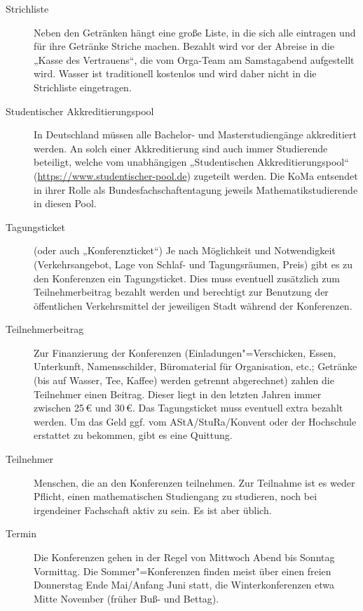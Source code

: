 \begin{description}
\item[Strichliste] Neben den Getränken hängt eine große Liste, in die sich alle
	eintragen und für ihre Getränke Striche machen.  Bezahlt wird vor der
	Abreise in die „Kasse des Vertrauens“, die vom Orga-Team am Samstagabend
	aufgestellt wird.  Wasser ist traditionell kostenlos und wird daher nicht
	in die Strichliste eingetragen.

\item[Studentischer Akkreditierungspool]\label{itm:pool} In Deutschland müssen alle Bachelor-
	und Masterstudiengänge akkreditiert werden. An solch einer Akkreditierung
	sind auch immer Studierende beteiligt, welche vom unabhängigen
	„Studentischen Akkreditierungspool“
	(\url{https://www.studentischer-pool.de}) zugeteilt werden. Die KoMa
	entsendet in ihrer Rolle als Bundesfachschaftentagung jeweils
	Mathematikstudierende in diesen Pool.

\item[Tagungsticket] (oder auch „Konferenzticket“) Je nach Möglichkeit und
	Notwendigkeit (Verkehrsangebot, Lage von Schlaf- und Tagungsräumen, Preis)
	gibt es zu den Konferenzen ein Tagungsticket. Dies muss eventuell
	zusätzlich zum Teilnehmerbeitrag bezahlt werden und berechtigt zur
	Benutzung der öffentlichen Verkehrsmittel der jeweiligen Stadt während der
	Konferenzen.

\item[Teilnehmerbeitrag] Zur Finanzierung der Konferenzen
	(Einladungen"=Verschicken, Essen, Unterkunft, Namensschilder, Büromaterial
	für Organisation, etc.; Getränke (bis auf Wasser, Tee, Kaffee) werden
	getrennt abgerechnet) zahlen die Teilnehmer einen Beitrag. Dieser liegt in
	den letzten Jahren immer zwischen 25\,€ und 30\,€. Das Tagungsticket muss
	eventuell extra bezahlt werden. Um das Geld ggf. vom AStA/StuRa/Konvent
	oder der Hochschule erstattet zu bekommen, gibt es eine Quittung.

\item[Teilnehmer] Menschen, die an den Konferenzen teilnehmen.  Zur Teilnahme
	ist es weder Pflicht, einen mathematischen Studiengang zu studieren, noch
	bei irgendeiner Fachschaft aktiv zu sein. Es ist aber üblich.

\item[Termin] Die Konferenzen gehen in der Regel von Mittwoch Abend bis Sonntag
	Vormittag. Die Sommer"=Konferenzen finden meist über einen freien Donnerstag
	Ende Mai/Anfang Juni statt, die Winterkonferenzen etwa Mitte November
	(früher Buß- und Bettag).


\end{description}

